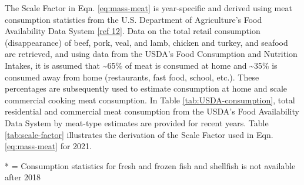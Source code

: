 \documentclass[
  11pt,
  oneside]{book}
\begin{document}
The Scale Factor in Eqn. \eqref{eq:mass-meat} is year-specific and derived using meat consumption statistics from the U.S. Department of Agriculture's Food Availability Data System \hyperref[cooking-references]{{[}ref 12{]}}. Data on the total retail consumption (disappearance) of beef, pork, veal, and lamb, chicken and turkey, and seafood are retrieved, and using data from the USDA's Food Consumption and Nutrition Intakes, it is assumed that \textasciitilde65\% of meat is consumed at home and \textasciitilde35\% is consumed away from home (restaurants, fast food, school, etc.). These percentages are subsequently used to estimate consumption at home and scale commercial cooking meat consumption. In Table \ref{tab:USDA-consumption}, total residential and commercial meat consumption from the USDA's Food Availability Data System by meat-type estimates are provided for recent years. Table \ref{tab:scale-factor} illustrates the derivation of the Scale Factor used in Eqn. \eqref{eq:mass-meat} for 2021.

\begin{table}[H]
\centering
\caption{\label{tab:USDA-consumption}Total Retail Consumption from USDA Food Availability Data System}
\centering
{}
\end{table}

\noindent
* = Consumption statistics for fresh and frozen fish and shellfish is not available after 2018 \newline
\end{document}
